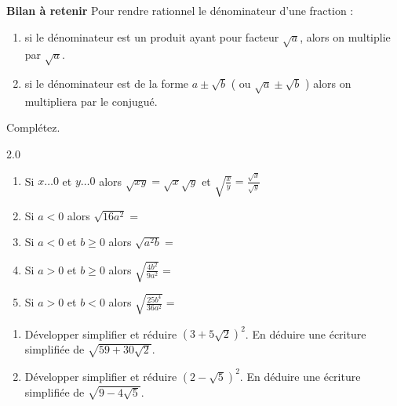 \documentclass[main.tex]{subfiles}
\begin{document}
%	 
\newpage  
\begin{tBox}
\textbf{Bilan à retenir} Pour rendre rationnel le dénominateur d'une fraction :
	\begin{enumerate}[label=\textbullet, leftmargin=*]
		\item si le dénominateur est un produit ayant pour facteur $\sqrt{a}$, alors on multiplie par   $\sqrt{a}$.
		\item si le dénominateur est de la forme $a\pm\sqrt{b}$  ( ou $\sqrt{a}\pm\sqrt{b}$ ) alors on multipliera par le conjugué.
	\end{enumerate}
\end{tBox}
\begin{exercise} Complétez.\vspace{-0.5em}
	\begin{spacing}{2.0}
		\begin{enumerate}[leftmargin=*,label={}]  
			\item Si $x\ldots 0$ et $y\ldots 0$  alors $\sqrt{xy}=\sqrt{x}\sqrt{y}$ et  $\sqrt{\frac{x}{y}}=\frac{\sqrt{x}}{\sqrt{y}}$ 
			\item Si $a<0$ alors $\sqrt{16a^2}=$\dotfill
			\item Si $a<0$ et $b\geqslant 0$ alors $\sqrt{a^2b}=$\dotfill  
			\item Si $a>0$ et $b\geqslant 0$ alors  $\sqrt{\frac{4b^2}{9a^2}}=$\dotfill  
			\item Si $a>0$  et $b<0$ alors  $\sqrt{\tfrac{25b^4}{36a^2}}=$\dotfill  
		\end{enumerate} 
	\end{spacing}
	\vspace{-0.5em}
\end{exercise}    
\begin{problem}  [classique] \hfill 
\begin{enumerate}[label={\arabic*)},leftmargin=*]
	\item Développer simplifier et réduire $(3+5\sqrt{2})^2$.  En déduire une écriture simplifiée de $\sqrt{59+30\sqrt{2}}$.
	\item Développer simplifier et réduire  $(2-\sqrt{5})^2$. En déduire une écriture simplifiée de $\sqrt{9-4\sqrt{5}}$.
\end{enumerate} 
\end{problem}   
\end{document}
